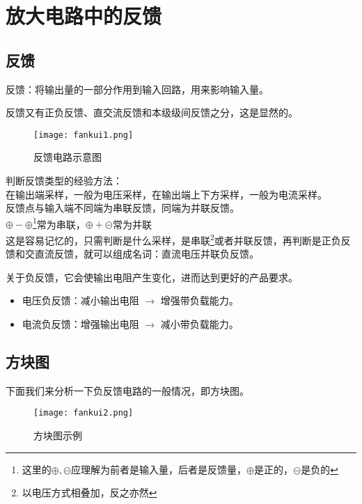 \documentclass[cn,pad,11pt,geye]{elegantnote}
\begin{document}
\section{放大电路中的反馈}
\subsection{反馈}
\begin{definition}
	反馈：将输出量的一部分作用到输入回路，用来影响输入量。
\end{definition}
\begin{note}
	反馈又有正负反馈、直交流反馈和本级级间反馈之分，这是显然的。
\end{note}
\begin{figure}[h]
	\centering
	\texttt{[image: fankui1.png]}
	\caption{反馈电路示意图}
\end{figure}
\begin{note}
	判断反馈类型的经验方法：\\
	在输出端采样，一般为电压采样，在输出端上下方采样，一般为电流采样。\\
	反馈点与输入端不同端为串联反馈，同端为并联反馈。\\
	$\oplus-\oplus$\footnote{这里的$\oplus,\circleddash$应理解为前者是输入量，后者是反馈量，$\oplus$是正的，$\circleddash$是负的}常为串联，$\oplus+\circleddash$常为并联\\
	这是容易记忆的，只需判断是什么采样，是串联\footnote{以电压方式相叠加，反之亦然}或者并联反馈，再判断是正负反馈和交直流反馈，就可以组成名词：直流电压并联负反馈。
\end{note}
\begin{proposition}[关于负反馈]
	关于负反馈，它会使输出电阻产生变化，进而达到更好的产品要求。
	\begin{itemize}
		\item 电压负反馈：减小输出电阻 $\to$ 增强带负载能力。
		\item 电流负反馈：增强输出电阻 $\to$ 减小带负载能力。
	\end{itemize}
\end{proposition}
\subsection{方块图}
下面我们来分析一下负反馈电路的一般情况，即方块图。
\begin{figure}[h]
	\centering
	\texttt{[image: fankui2.png]}
	\caption{方块图示例}
\end{figure}
\end{document}
